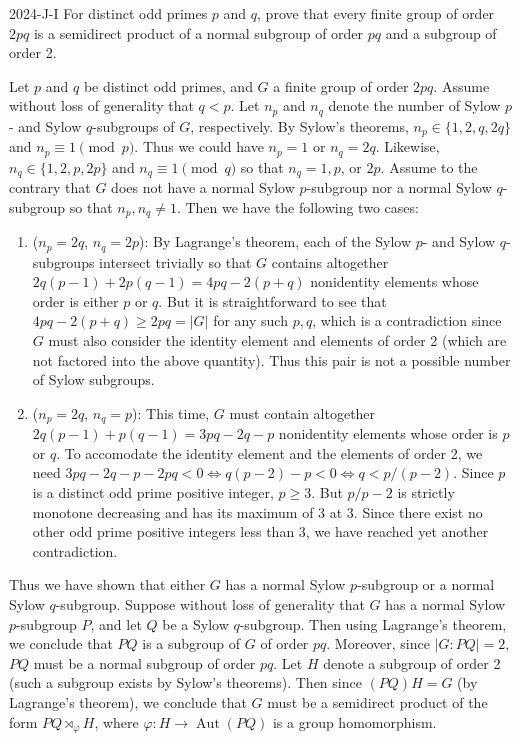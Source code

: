 \documentclass{article}
\begin{document}
	\begin{prb}{2024-J-I}
		For distinct odd primes $p$ and $q$, prove that every finite group of order $2pq$ is a semidirect product of a normal subgroup of order $pq$ and a subgroup of order 2. \label{prb:2024-J-I-1}
	\end{prb}
	Let $p$ and $q$ be distinct odd primes, and $G$ a finite group of order $2pq$. Assume without loss of generality that $q < p$. Let $n_{p}$ and $n_{q}$ denote the number of Sylow $p$- and Sylow $q$-subgroups of $G$, respectively. By Sylow's theorems, $n_{p} \in \{1, 2, q, 2q\}$ and $n_{p} \equiv 1 \pmod{p}$. Thus we could have $n_{p} = 1$ or $n_{q} = 2q$. Likewise, $n_{q} \in \{1, 2, p, 2p\}$ and $n_{q} \equiv 1 \pmod{q}$ so that $n_{q} = 1, p$, or $2p$. Assume to the contrary that $G$ does not have a normal Sylow $p$-subgroup nor a normal Sylow $q$-subgroup so that $n_{p}, n_{q} \neq 1$. Then we have the following two cases: \vspace{-0.25cm}
	\begin{enumerate}[itemsep =-2pt,label = (\arabic{*})]
		\item ($n_{p} = 2q$, $n_{q} = 2p$): By Lagrange's theorem, each of the Sylow $p$- and Sylow $q$-subgroups intersect trivially so that $G$ contains altogether $2q(p - 1) + 2p(q - 1) = 4pq - 2(p + q)$ nonidentity elements whose order is either $p$ or $q$. But it is straightforward to see that $4pq - 2(p + q) \geq 2pq = |G|$ for any such $p, q$, which is a contradiction since $G$ must also consider the identity element and elements of order 2 (which are not factored into the above quantity). Thus this pair is not a possible number of Sylow subgroups. 
		\item ($n_{p} = 2q$, $n_{q} = p$): This time, $G$ must contain altogether $2q(p - 1) + p(q - 1) = 3pq - 2q -p$ nonidentity elements whose order is $p$ or $q$. To accomodate the identity element and the elements of order 2, we need $3pq - 2q - p - 2pq < 0 \iff q(p - 2) - p < 0 \iff q < p/(p - 2)$. Since $p$ is a distinct odd prime positive integer, $p \geq 3$. But $p/p - 2$ is strictly monotone decreasing and has its maximum of 3 at 3. Since there exist no other odd prime positive integers less than 3, we have reached yet another contradiction. 
	\end{enumerate}
	Thus we have shown that either $G$ has a normal Sylow $p$-subgroup or a normal Sylow $q$-subgroup. Suppose without loss of generality that $G$ has a normal Sylow $p$-subgroup $P$, and let $Q$ be a Sylow $q$-subgroup. Then using Lagrange's theorem, we conclude that $PQ$ is a subgroup of $G$ of order $pq$. Moreover, since $|G:PQ| = 2$, $PQ$ must be a normal subgroup of order $pq$. Let $H$ denote a subgroup of order 2 (such a subgroup exists by Sylow's theorems). Then since $(PQ)H = G$ (by Lagrange's theorem), we conclude that $G$ must be a semidirect product of the form $PQ \rtimes_{\varphi} H$, where $\varphi: H \to \operatorname{Aut}(PQ)$ is a group homomorphism. 
	
\end{document}
